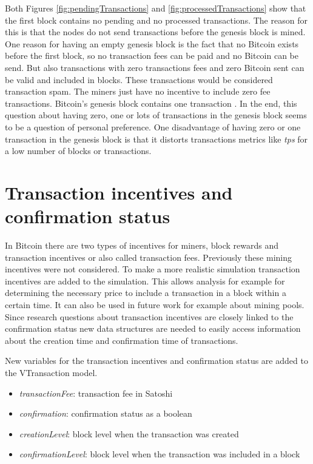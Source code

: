Both Figures \ref{fig:pendingTransactions} and \ref{fig:processedTransactions} show that the first block contains no pending and no processed transactions. The reason for this is that the nodes do not send transactions before the genesis block is mined. One reason for having an empty genesis block is the fact that no Bitcoin exists before the first block, so no transaction fees can be paid and no Bitcoin can be send. But also transactions with zero transactions fees and zero Bitcoin sent can be valid and included in blocks. These transactions would be considered transaction spam. The miners just have no incentive to include zero fee transactions. Bitcoin's genesis block contains one transaction \cite{genesis}. In the end, this question about having zero, one or lots of transactions in the genesis block seems to be a question of personal preference. One disadvantage of having zero or one transaction in the genesis block is that it distorts transactions metrics like \textit{tps} for a low number of blocks or transactions.

\section{Transaction incentives and confirmation status}

In Bitcoin there are two types of incentives for miners, block rewards and transaction incentives or also called transaction fees. Previously these mining incentives were not considered. To make a more realistic simulation transaction incentives are added to the simulation. This allows analysis for example for determining the necessary price to include a transaction in a block within a certain time. It can also be used in future work for example about mining pools. Since research questions about transaction incentives are closely linked to the confirmation status new data structures are needed to easily access information about the creation time and confirmation time of transactions.

New variables for the transaction incentives and confirmation status are added to the VTransaction model. 

\begin{itemize}
\item \textit{transactionFee}: transaction fee in Satoshi
\item \textit{confirmation}: confirmation status as a boolean
\item \textit{creationLevel}: block level when the transaction was created
\item \textit{confirmationLevel}: block level when the transaction was included in a block
\end{itemize}

